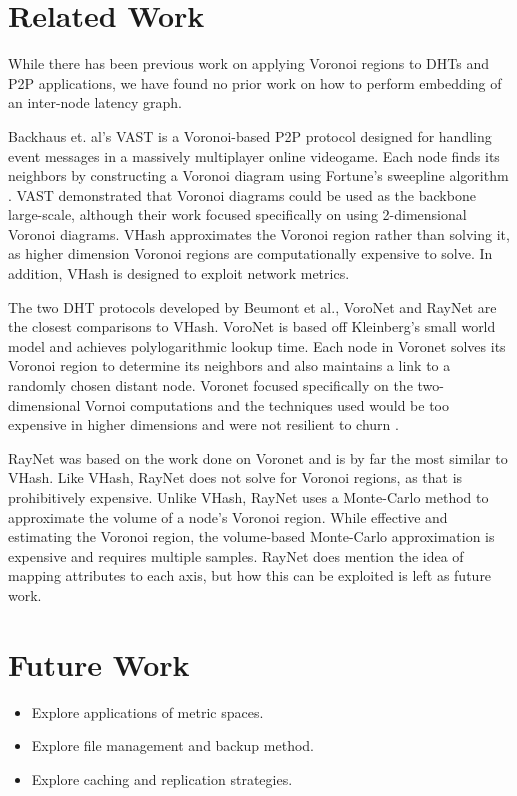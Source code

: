 \documentclass{IEEEtran}
\begin{document}
\section{Related Work}
While there has been previous work on applying Voronoi regions to DHTs and P2P applications, we have found no prior work on how to perform embedding of an inter-node latency graph.   

Backhaus et. al's  VAST \cite{Backhaus:2007:VAS:1326257.1326266} is a Voronoi-based P2P protocol designed for handling event messages in a massively multiplayer online videogame.  
Each node finds its neighbors by constructing a Voronoi diagram using Fortune's sweepline algorithm \cite{fortune1987sweepline}.  
VAST demonstrated that Voronoi diagrams could be used as the backbone  large-scale, although their work focused specifically on using 2-dimensional Voronoi diagrams.  
VHash approximates the Voronoi region rather than solving it, as higher dimension Voronoi regions are computationally expensive to solve.
In addition, VHash is designed to exploit network metrics.

The two DHT protocols developed by Beumont et al., VoroNet \cite{voronet} and RayNet \cite{raynet} are the closest comparisons to VHash.
VoroNet is based off Kleinberg's small world model \cite{kleinberg2000navigation} and achieves polylogarithmic lookup time.  
Each node in Voronet solves its Voronoi region to determine its neighbors and also maintains a link to a randomly chosen distant node.
Voronet focused specifically on the two-dimensional Vornoi computations and the techniques used would be too expensive in higher dimensions and were not resilient to churn  \cite{raynet}.

RayNet \cite{raynet} was based on the work done on Voronet and is by far the most similar to VHash.  
Like VHash, RayNet does not solve for Voronoi regions, as that is prohibitively expensive.  
Unlike VHash, RayNet uses a Monte-Carlo method to approximate the volume of a node's Voronoi region.  
While effective and estimating the Voronoi region,  the volume-based Monte-Carlo approximation is expensive and requires multiple samples. 
RayNet does mention the idea of mapping attributes to each axis, but how this can be exploited is left as future work.



 

\section{Future Work}
\begin{itemize}
\item Explore applications of metric spaces.
\item Explore file management and backup method.
\item Explore caching and replication strategies.
\end{itemize}





\end{document}
